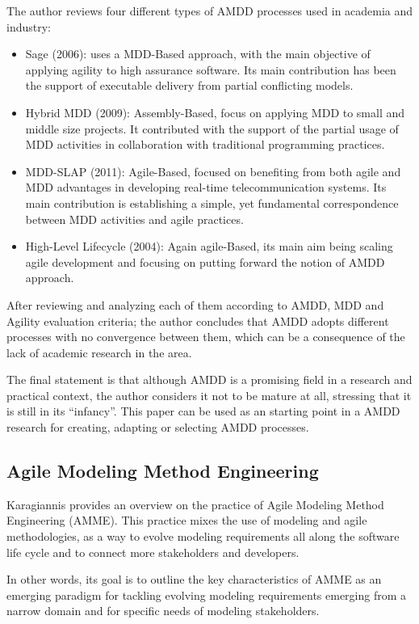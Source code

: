 \documentclass[10pt, a4paper, twocolumn]{article}
\begin{document}
The author reviews four different types of AMDD processes used in academia and industry:
\begin{itemize}
\item Sage (2006): uses a MDD-Based approach, with the main objective of applying agility to high assurance software. Its main contribution has been the support of executable delivery from partial conflicting models.
\item Hybrid MDD (2009): Assembly-Based, focus on applying MDD to small and middle size projects. It contributed with the support of the partial usage of MDD activities in collaboration with traditional programming practices.
\item MDD-SLAP (2011): Agile-Based, focused on benefiting from both agile and MDD advantages in developing real-time telecommunication systems. Its main contribution is establishing a simple, yet fundamental correspondence between MDD activities and agile practices.
\item High-Level Lifecycle (2004): Again agile-Based, its main aim being scaling agile development and focusing on putting forward the notion of AMDD approach.
\end{itemize}

After reviewing and analyzing each of them according to AMDD, MDD and Agility evaluation criteria; the author concludes that AMDD adopts different processes with no convergence between them, which can be a consequence of the lack of academic research in the area.

The final statement is that although AMDD is a promising field in a research and practical context, the author considers it not to be mature at all, stressing that it is still in its “infancy”. This paper can be used as an starting point in a AMDD research for creating, adapting or selecting AMDD processes.

\subsection{Agile Modeling Method Engineering}

Karagiannis \cite{4} provides an overview on the practice of Agile Modeling Method Engineering (AMME). This practice mixes the use of modeling and agile methodologies, as a way to evolve modeling requirements all along the software life cycle and to connect more stakeholders and developers.

In other words, its goal is to outline the key characteristics of AMME as an emerging paradigm for tackling evolving modeling requirements emerging from a narrow domain and for specific
needs of modeling stakeholders.
\end{document}
